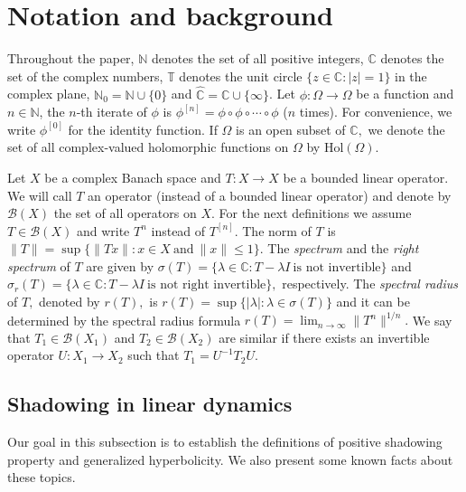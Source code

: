 \documentclass[11pt]{amsart}
\theoremstyle{plain}
\theoremstyle{remark}
\theoremstyle{plain}
\begin{document}


\section{Notation and background}\label{section 2}
Throughout the paper, $\mathbb{N}$ denotes the set of all positive integers, $\mathbb{C}$ denotes the set of the complex numbers, $\mathbb{T}$ denotes the unit circle $\{z\in \mathbb{C}:|z|=1\}$ in the complex plane, $\mathbb{N}_0= \mathbb{N}\cup \{0\}$ and $\widehat{\mathbb{C}}=\mathbb{C}\cup\{\infty\}$. Let $\phi:\Omega\to \Omega$ be a function and $n\in \mathbb{N}$, the $n$-th iterate of $\phi$ is $\phi^{[n]}=\phi\circ \phi\circ\cdots \circ \phi$ ($n$ times). For convenience, we write $\phi^{[0]}$ for the identity function.  If $\Omega$ is an open subset of $\mathbb{C},$ we denote the set of all complex-valued holomorphic functions on $\Omega$ by $\mathrm{Hol}(\Omega).$ 


Let $X$ be a complex Banach space and $T:X\to X$ be a bounded linear operator. We will call $T$ an operator (instead of a bounded linear operator) and denote by $\mathcal{B}(X)$ the set of all  operators on $X.$ For the next definitions we assume $T\in \mathcal{B}(X)$ and   write $T^n$ instead of $T^{[n]}.$ The norm of $T$ is $\|T\|=\sup\{\|Tx\|:x\in X \ \text{and} \ \|x\|\leq 1\}.$ The \textit{spectrum} and the \textit{right spectrum} of $T$ are given by $\sigma(T)=\{  \lambda \in \mathbb{C}: T-\lambda I \ \text{is not invertible} \}$ and $\sigma_r(T)=\{\lambda \in \mathbb{C}: T-\lambda I \ \text{is not right invertible} \},$ respectively. The \textit{spectral radius} of $T,$ denoted by $r(T),$ is $r(T)=\sup\{|\lambda|: \lambda\in \sigma(T)\}$ and it can be determined by the spectral radius formula $r(T)=\displaystyle \lim_{n\to \infty}  \|T^n\|^{1/n}.$ We say that   $T_1\in \mathcal{B}(X_1)$ and $T_2\in \mathcal{B}(X_2)$ are similar if there exists an invertible operator $U:X_1\rightarrow X_2$ such that $T_1=U^{-1}T_2U.$

\subsection{Shadowing in linear dynamics} Our goal in this subsection is to  establish the definitions of positive shadowing property and generalized hyperbolicity. We also present some known facts about these topics.
\end{document}
